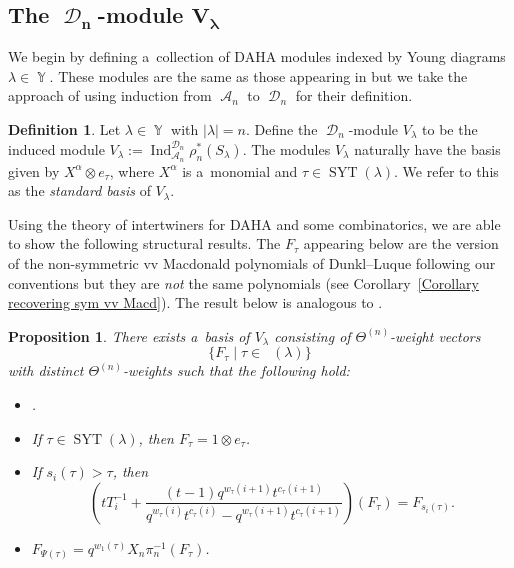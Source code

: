 \documentclass[10pt,a4paper]{amsart}
\numberwithin{equation}{section}
\newtheorem{Proposition}[Theorem]{Proposition}
\theoremstyle{definition}
\newtheorem{Definition}[Theorem]{Definition}
\DeclareMathOperator{\Par}{\mathbb{Y}}
\DeclareMathOperator{\SYT}{\mathrm{SYT}}
\DeclareMathOperator{\PSYT}{\mathrm{PSYT}_{\geq 0}}
\DeclareMathOperator{\sA}{\mathscr{A}}
\DeclareMathOperator{\sD}{\mathscr{D}}
\DeclareMathOperator{\Ind}{Ind}
\begin{document}
\subsection[The D\_n-module V\_lambda]{The $\boldsymbol{\sD_n}$-module $\boldsymbol{V_{\lambda}}$}
 We begin by defining a~collection of DAHA modules indexed by Young diagrams $\lambda \in \Par$. These modules are the same as those appearing in \cite[Definition 3.1]{DL_2011} but we take the approach of using induction from $\sA_n$ to $\sD_n$ for their definition.

 \begin{Definition}
 Let $\lambda \in \Par$ with $|\lambda| = n$. Define the $\sD_n$-module $V_{\lambda}$ to be the induced module
 $V_{\lambda}:= \Ind_{\sA_n}^{\sD_n}\rho_n^{*}(S_{\lambda})$. The modules $V_{\lambda}$ naturally have the basis given by $X^{\alpha}\otimes e_{\tau}$, where $X^{\alpha}$ is a~monomial and $\tau \in \SYT(\lambda)$. We refer to this as the \textit{standard basis} of $V_{\lambda}$.
 \end{Definition}

Using the theory of intertwiners for DAHA and some combinatorics, we are able to show the following structural results. The $F_{\tau}$ appearing below are the version of the non-symmetric vv Macdonald polynomials of Dunkl--Luque following our conventions but they are \textit{not} the same polynomials (see Corollary~\ref{Corollary recovering sym vv Macd}). The result below is analogous to \cite[Theorem 4.12]{DL_2011}.

\begin{Proposition}\label{weight basis Proposition}
 There exists a~basis of $V_{\lambda}$ consisting of $\Theta^{(n)}$-weight vectors \[
 \{F_{\tau}\mid \tau \in \PSYT(\lambda)\}\] with distinct $\Theta^{(n)}$-weights such that the following hold:
 \begin{itemize}
\itemsep=0pt
 \item {}.
 \item If $\tau \in \SYT(\lambda)$, then $F_{\tau} = 1\otimes e_{\tau}$.
 \item If $s_i(\tau) > \tau$, then
 \[
 \left( tT_{i}^{-1} + \frac{(t-1)q^{w_{\tau}(i+1)}t^{c_{\tau}(i+1)}}{q^{w_{\tau}(i)}t^{c_{\tau}(i)}-q^{w_{\tau}(i+1)}t^{c_{\tau}(i+1)}}\right)(F_{\tau}) = F_{s_i(\tau)}.
 \]
 \item $F_{\Psi(\tau)} = q^{w_1(\tau)}X_n\pi_n^{-1}(F_{\tau})$.
 \end{itemize}
\end{Proposition}
\end{document}
